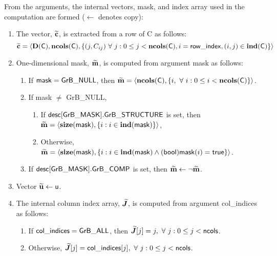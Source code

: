 From the arguments, the internal vectors, mask, and index array used in 
the computation are formed ($\leftarrow$ denotes copy):
\begin{enumerate}
	\item The vector, ${\bf \widetilde{c}}$, is extracted from a row of {\sf C}
    as follows:
    \[
        {\bf \widetilde{c}} = \langle  \bold{D}({\sf C}), \bold{ncols}({\sf C}), 
        \{ (j, C_{ij}) \ \forall \ j : 0 \leq j < \bold{ncols}({\sf C}),
        i = {\sf row\_index}, (i, j) \in \bold{ind}({\sf C})\} \rangle
    \]

	\item One-dimensional mask, ${\bf \widetilde{m}}$, is computed from 
    argument {\sf mask} as follows:
	\begin{enumerate}
		\item If ${\sf mask} = {\sf GrB\_NULL}$, then ${\bf \widetilde{m}} = 
        \langle \bold{ncols}({\sf C}), \{i, \ \forall \ i : 0 \leq i < 
        \bold{ncols}({\sf C}) \} \rangle$.

		\item If {\sf mask} $\ne$ {\sf GrB\_NULL},  
        \begin{enumerate}
            \item If ${\sf desc[GrB\_MASK].GrB\_STRUCTURE}$ is set, then
            ${\bf \widetilde{m}} = 
            \langle \bold{size}({\sf mask}), \{i : i \in \bold{ind}({\sf mask}) \} \rangle$,
            \item Otherwise, ${\bf \widetilde{m}} = 
            \langle \bold{size}({\sf mask}), \{i : i \in \bold{ind}({\sf mask}) \wedge
            ({\sf bool}){\sf mask}(i) = {\sf true} \} \rangle$.
        \end{enumerate}

		\item	If ${\sf desc[GrB\_MASK].GrB\_COMP}$ is set, then 
        ${\bf \widetilde{m}} \leftarrow \neg {\bf \widetilde{m}}$.
	\end{enumerate}

	\item Vector ${\bf \widetilde{u}} \leftarrow {\sf u}$.
    
    \item The internal column index array, $\bm{\widetilde{J}}$, is computed from 
    argument {\sf col\_indices} as follows:
	\begin{enumerate}
		\item	If ${\sf col\_indices} = {\sf GrB\_ALL}$, then 
        $\bm{\widetilde{J}}[j] = j, \ \forall \ j : 0 \leq j < {\sf ncols}$.

		\item	Otherwise, $\bm{\widetilde{J}}[j] = {\sf col\_indices}[j], 
        \ \forall \ j : 0 \leq j < {\sf ncols}$.
    \end{enumerate}
\end{enumerate}

